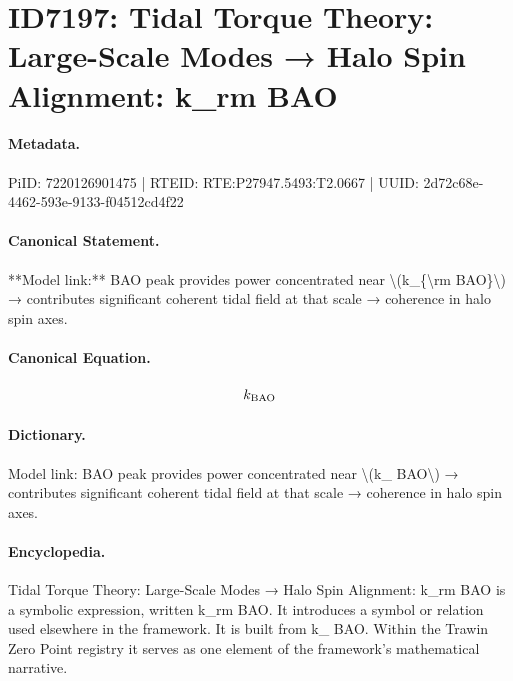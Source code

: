 \section*{ID7197: Tidal Torque Theory: Large-Scale Modes → Halo Spin Alignment: k\_rm BAO}
\paragraph{Metadata.}
PiID: 7220126901475 | RTEID: RTE:P27947.5493:T2.0667 | UUID: 2d72c68e-4462-593e-9133-f04512cd4f22

\paragraph{Canonical Statement.}
**Model link:** BAO peak provides power concentrated near \textbackslash{}(k\_\{\textbackslash{}rm BAO\}\textbackslash{}) → contributes significant coherent tidal field at that scale → coherence in halo spin axes.

\paragraph{Canonical Equation.}
\[
k_{\rm BAO}
\]

\paragraph{Dictionary.}
Model link: BAO peak provides power concentrated near \textbackslash{}(k\_ BAO\textbackslash{}) → contributes significant coherent tidal field at that scale → coherence in halo spin axes.

\paragraph{Encyclopedia.}
Tidal Torque Theory: Large-Scale Modes → Halo Spin Alignment: k\_rm BAO is a symbolic expression, written k\_rm BAO. It introduces a symbol or relation used elsewhere in the framework. It is built from k\_ BAO. Within the Trawin Zero Point registry it serves as one element of the framework's mathematical narrative.
